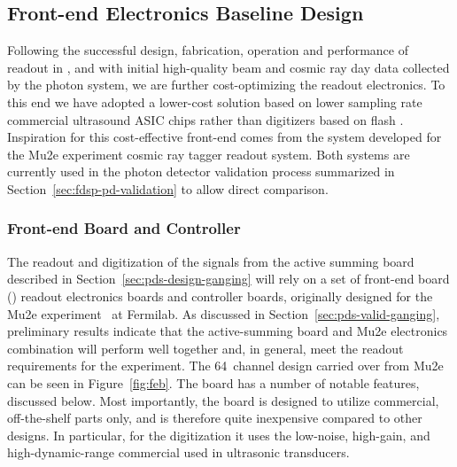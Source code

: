 

\subsection{Front-end Electronics Baseline Design}
\label{sec:electronics}

Following the successful design, fabrication, operation and performance of  readout in , and with initial high-quality beam and cosmic ray day data collected by the  photon system, we are
further cost-optimizing the readout electronics.  To this end we have adopted a lower-cost solution based on lower sampling rate commercial ultrasound ASIC chips rather than digitizers based on flash . Inspiration for this cost-effective front-end comes from the system developed for the Mu2e experiment cosmic ray tagger readout system.
Both systems are currently used in the photon detector validation process summarized in Section~\ref{sec:fdsp-pd-validation} to allow direct comparison.


\subsubsection{Front-end Board and Controller}

The readout and digitization of the signals from the active summing board described in Section~\ref{sec:pds-design-ganging} will rely on a set of front-end board () readout electronics boards and controller boards, originally designed for the Mu2e experiment~\cite{bib:mu2e_tdr}
at Fermilab. As discussed in Section~\ref{sec:pds-valid-ganging}, preliminary results indicate that the active-summing board and Mu2e electronics  combination will perform well together and, in general, meet the readout requirements for the experiment. The 64~channel  design carried over from Mu2e can be seen in Figure~\ref{fig:feb}. The board has a number of notable features, discussed below. Most importantly, %
the board is designed to utilize commercial, off-the-shelf parts only, and is therefore quite inexpensive compared to other designs. In particular, for the digitization it uses the low-noise, high-gain, and high-dynamic-range commercial  used in ultrasonic transducers. 

